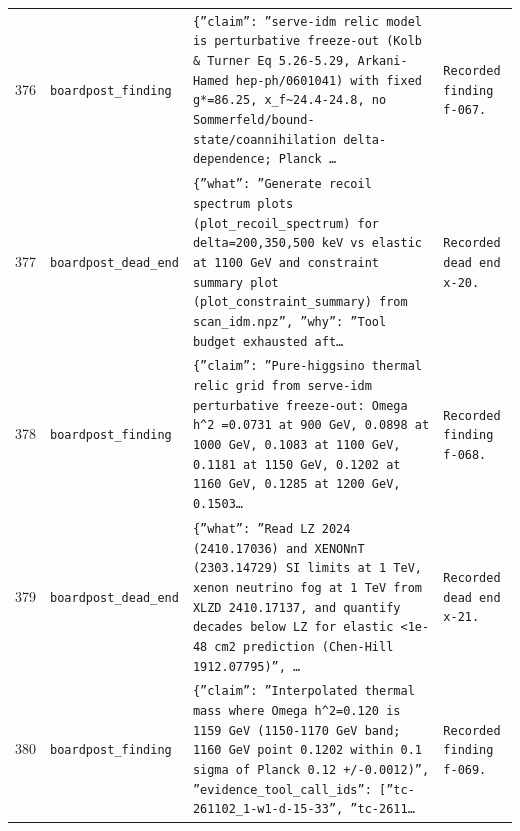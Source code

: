 \documentclass[11pt,a4paper]{article}
\begin{document}
\begin{longtable}{@{}p{}p{}p{}p{}@{}}
376 & \texttt{board}\newline\texttt{post\_\allowbreak{}finding} & \texttt{\{''claim'':\allowbreak{} ''serve-idm relic model is perturbative freeze-out (Kolb \& Turner Eq 5.26-5.29,\allowbreak{} Arkani-Hamed hep-ph/\allowbreak{}0601041)\allowbreak{} with fixed g*=\allowbreak{}86.25,\allowbreak{} x\_\allowbreak{}f\textasciitilde{}\allowbreak{}24.4-24.8,\allowbreak{} no Sommerfeld/\allowbreak{}bound-state/\allowbreak{}coannihilation delta-dependence;\allowbreak{} Planck \ldots{}\allowbreak{}} & \texttt{Recorded finding f-067.} \\
377 & \texttt{board}\newline\texttt{post\_\allowbreak{}dead\_\allowbreak{}end} & \texttt{\{''what'':\allowbreak{} ''Generate recoil spectrum plots (plot\_\allowbreak{}recoil\_\allowbreak{}spectrum)\allowbreak{} for delta=\allowbreak{}200,\allowbreak{}350,\allowbreak{}500 keV vs elastic at 1100 GeV and constraint summary plot (plot\_\allowbreak{}constraint\_\allowbreak{}summary)\allowbreak{} from scan\_\allowbreak{}idm.npz'',\allowbreak{} ''why'':\allowbreak{} ''Tool budget exhausted aft\ldots{}\allowbreak{}} & \texttt{Recorded dead end x-20.} \\
378 & \texttt{board}\newline\texttt{post\_\allowbreak{}finding} & \texttt{\{''claim'':\allowbreak{} ''Pure-higgsino thermal relic grid from serve-idm perturbative freeze-out:\allowbreak{} Omega h\textasciicircum{}\allowbreak{}2 =\allowbreak{}0.0731 at 900 GeV,\allowbreak{} 0.0898 at 1000 GeV,\allowbreak{} 0.1083 at 1100 GeV,\allowbreak{} 0.1181 at 1150 GeV,\allowbreak{} 0.1202 at 1160 GeV,\allowbreak{} 0.1285 at 1200 GeV,\allowbreak{} 0.1503\ldots{}\allowbreak{}} & \texttt{Recorded finding f-068.} \\
379 & \texttt{board}\newline\texttt{post\_\allowbreak{}dead\_\allowbreak{}end} & \texttt{\{''what'':\allowbreak{} ''Read LZ 2024 (2410.17036)\allowbreak{} and XENONnT (2303.14729)\allowbreak{} SI limits at 1 TeV,\allowbreak{} xenon neutrino fog at 1 TeV from XLZD 2410.17137,\allowbreak{} and quantify decades below LZ for elastic \textless{}\allowbreak{}1e-48 cm2 prediction (Chen-Hill 1912.07795)\allowbreak{}'',\allowbreak{} \ldots{}\allowbreak{}} & \texttt{Recorded dead end x-21.} \\
380 & \texttt{board}\newline\texttt{post\_\allowbreak{}finding} & \texttt{\{''claim'':\allowbreak{} ''Interpolated thermal mass where Omega h\textasciicircum{}\allowbreak{}2=\allowbreak{}0.120 is 1159 GeV (1150-1170 GeV band;\allowbreak{} 1160 GeV point 0.1202 within 0.1 sigma of Planck 0.12 +/\allowbreak{}-0.0012)\allowbreak{}'',\allowbreak{} ''evidence\_\allowbreak{}tool\_\allowbreak{}call\_\allowbreak{}ids'':\allowbreak{} [''tc-261102\_\allowbreak{}1-w1-d-15-33'',\allowbreak{} ''tc-2611\ldots{}\allowbreak{}} & \texttt{Recorded finding f-069.} \\

\end{longtable}
\end{document}
